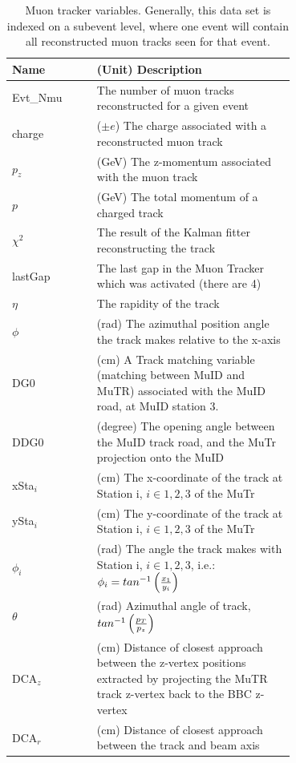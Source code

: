 \begin{table}[ht]
  \centering
  \begin{tabular}{l p{0.7\linewidth}}
    \toprule
    \textbf{Name} & \textbf{(Unit) Description} \\
    \midrule
    Evt\_Nmu & The number of muon tracks reconstructed for a given event \\
    charge & ($\pm e$) The charge associated with a reconstructed muon track \\ 
    $p_z$ & (GeV) The z-momentum associated with the muon track \\
    $p$ & (GeV) The total momentum of a charged track \\
    $\chi^2$ & The result of the Kalman fitter reconstructing the track \\
    lastGap & The last gap in the Muon Tracker which was activated (there are 4) \\
    $\eta$ & The rapidity of the track \\
    $\phi$ & (rad) The azimuthal position angle the track makes relative to the x-axis \\
    DG0 & (cm) A Track matching variable (matching between MuID and MuTR) associated with the MuID road, at MuID station 3. \\
    DDG0 & (degree)  The opening angle between the MuID track road, and the MuTr projection onto the MuID \\
    xSta${}_i$ & (cm) The x-coordinate of the track at Station i,  $i\in{1,2,3}$ of the MuTr \\
    ySta${}_i$ & (cm) The y-coordinate of the track at Station i, $i\in{1,2,3}$ of the MuTr \\

    $\phi_i$ & (rad) The angle the track makes with Station i, $i\in{1,2,3}$, i.e.: $\phi_i = tan^{-1}\left({{x_1}\over{y_i}}\right)$ \\
    $\theta$ & (rad) Azimuthal angle of track, $tan^{-1}\left({p_T \over p_z}\right)$ \\
    DCA${}_z$ & (cm) Distance of closest approach between the z-vertex positions extracted by projecting the MuTR track z-vertex back to the BBC z-vertex \\
    DCA${}_r$ & (cm) Distance of closest approach between the track and beam axis \\ 
    \bottomrule
  \end{tabular}
  \caption{
    Muon tracker variables. Generally, this data set is indexed on a subevent 
    level, where one event will contain all reconstructed muon tracks seen for 
    that event.
  }
  \label{tab:mutr_variables}
\end{table}

